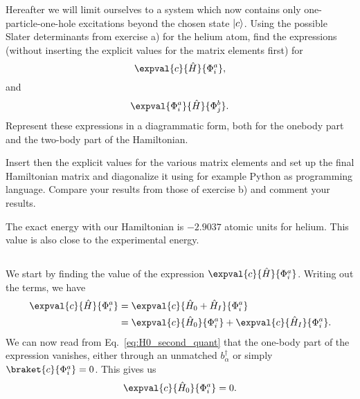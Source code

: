 Hereafter we will limit ourselves to a system which now contains only one-particle-one-hole excitations beyond the chosen state $\lvert c\rangle$.
Using the possible Slater determinants from exercise a) for the helium atom, find the expressions (without inserting the explicit values for the matrix elements first) for %
\begin{equation*}
    \expval{c}{\hat{H}}{\Phi_i^a},
\end{equation*}
and
\begin{equation*}
    \expval{\Phi_i^a}{\hat{H}}{\Phi_j^b}.
\end{equation*}
Represent these expressions in a diagrammatic form, both for the onebody part and the two-body part of the Hamiltonian.

Insert then the explicit values for the various matrix elements and set up the final Hamiltonian matrix and diagonalize it using for example Python as programming language.
Compare your results from those of exercise b) and comment your results. %

The exact energy with our Hamiltonian is $-2.9037$ atomic units for helium.
This value is also close to the experimental energy.

\subsection{}
We start by finding the value of the expression $\expval{c}{\hat{H}}{\Phi_i^a}$.
Writing out the terms, we have
\begin{align*}
    \expval{c}{\hat{H}}{\Phi_i^a} &= \expval{c}{\hat{H}_0 + \hat{H}_I}{\Phi_i^a} \\
    &= \expval{c}{\hat{H}_0}{\Phi_i^a} + \expval{c}{\hat{H}_I}{\Phi_i^a}.
\end{align*}
We can now read from Eq.~\eqref{eq:H0_second_quant} that the one-body part of the expression vanishes, either through an unmatched $b_\alpha^\dagger$ or simply $\braket{c}{\Phi_i^a} = 0$.
This gives us
\begin{equation}\label{eq:1p1h-ground-onebody}
    \expval{c}{\hat{H}_0}{\Phi_i^a} = 0.
\end{equation}

